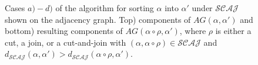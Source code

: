 \documentclass{svmult}
\newcommand{\m}[1]{\mathcal{#1}}
\begin{document}
\begin{figure}
\centering
{}\quad
{}\quad
{}\quad
{}

	\caption{Cases $a)-d)$ of the algorithm for sorting $\alpha$ into 
		$\alpha'$ under $\m{SCAJ}$ shown on the adjacency graph. Top) components of
		$AG(\alpha,\alpha')$ and bottom) resulting components of $AG(\alpha \circ \rho,\alpha')$, where $\rho$ is
	either a cut, a join, or a cut-and-join with $(\alpha,\alpha\circ\rho)\in \m{SCAJ}$ and 
	$d_{\m{SCAJ}}(\alpha,\alpha')>d_{\m{SCAJ}}(\alpha\circ\rho,\alpha')$.}
	\label{fig:scaj_algorithm_cases}
\end{figure}
\end{document}
